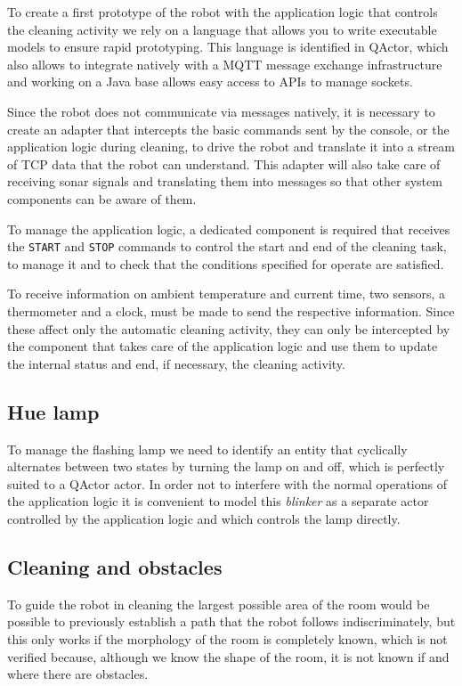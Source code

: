 To create a first prototype of the robot with the application logic that controls the cleaning activity we rely on a language that allows you to write executable models to ensure rapid prototyping. This language is identified in QActor, which also allows to integrate natively with a MQTT message exchange infrastructure and working on a Java base allows easy access to APIs to manage sockets.

Since the robot does not communicate via messages natively, it is necessary to create an adapter that intercepts the basic commands sent by the console, or the application logic during cleaning, to drive the robot and translate it into a stream of TCP data that the robot can understand. This adapter will also take care of receiving sonar signals and translating them into messages so that other system components can be aware of them.

To manage the application logic, a dedicated component is required that receives the \texttt{START} and \texttt{STOP} commands to control the start and end of the cleaning task, to manage it and to check that the conditions specified for operate are satisfied.

To receive information on ambient temperature and current time, two sensors, a thermometer and a clock, must be made to send the respective information. Since these affect only the automatic cleaning activity, they can only be intercepted by the component that takes care of the application logic and use them to update the internal status and end, if necessary, the cleaning activity.

\subsection{Hue lamp}
To manage the flashing lamp we need to identify an entity that cyclically alternates between two states by turning the lamp on and off, which is perfectly suited to a QActor actor. In order not to interfere with the normal operations of the application logic it is convenient to model this \textit{blinker} as a separate actor controlled by the application logic and which controls the lamp directly.

\subsection{Cleaning and obstacles}
To guide the robot in cleaning the largest possible area of ​​the room would be possible to previously establish a path that the robot follows indiscriminately, but this only works if the morphology of the room is completely known, which is not verified because, although we know the shape of the room, it is not known if and where there are obstacles.

